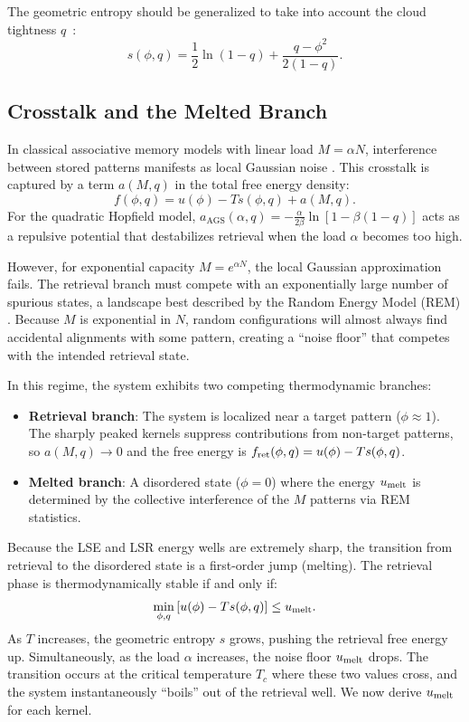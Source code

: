 \documentclass{article}
\theoremstyle{plain}
\theoremstyle{definition}
\theoremstyle{remark}
\begin{document}
The geometric entropy should be generalized to take into account the cloud tightness $q$~\cite{gardner1988space}:
\begin{equation}
    s(\phi, q) = \frac{1}{2} \ln(1-q) + \frac{q - \phi^2}{2(1-q)}.
\end{equation}

\subsection{Crosstalk and the Melted Branch}

In classical associative memory models with linear load $M = \alpha N$, interference between stored patterns manifests as local Gaussian noise \cite{amit1987statistical}. This crosstalk is captured by a term $a(M, q)$ in the total free energy density:
\begin{equation}
    f(\phi, q) = u(\phi) - T s(\phi, q) + a(M, q).
    \label{eq:total_free_energy}
\end{equation}
For the quadratic Hopfield model, $a_{\text{AGS}}(\alpha, q) = -\frac{\alpha}{2\beta} \ln [1 - \beta(1 - q)]$ acts as a repulsive potential that destabilizes retrieval when the load $\alpha$ becomes too high.

However, for exponential capacity $M = e^{\alpha N}$, the local Gaussian approximation fails. The retrieval branch must compete with an exponentially large number of spurious states, a landscape best described by the Random Energy Model (REM) \cite{derrida1980random}. Because $M$ is exponential in $N$, random configurations will almost always find accidental alignments with some pattern, creating a ``noise floor'' that competes with the intended retrieval state.

In this regime, the system exhibits two competing thermodynamic branches:
\begin{itemize}
    \item \textbf{Retrieval branch}: The system is localized near a target pattern ($\phi \approx 1$). The sharply peaked kernels suppress contributions from non-target patterns, so $a(M,q) \to 0$ and the free energy is $f_{\rm ret}(\phi, q) = u(\phi) - T s(\phi, q)$.
    \item \textbf{Melted branch}: A disordered state ($\phi = 0$) where the energy $u_{\rm melt}$ is determined by the collective interference of the $M$ patterns via REM statistics.
\end{itemize}
Because the LSE and LSR energy wells are extremely sharp, the transition from retrieval to the disordered state is a first-order jump (melting). The retrieval phase is thermodynamically stable if and only if:
\begin{equation}
    \min_{\phi, q} \left[ u(\phi) - T s(\phi, q) \right] \leq u_{\rm melt}.
\end{equation}
As $T$ increases, the geometric entropy $s$ grows, pushing the retrieval free energy up. Simultaneously, as the load $\alpha$ increases, the noise floor $u_{\rm melt}$ drops. The transition occurs at the critical temperature $T_c$ where these two values cross, and the system instantaneously ``boils'' out of the retrieval well. We now derive $u_{\rm melt}$ for each kernel.
\end{document}
